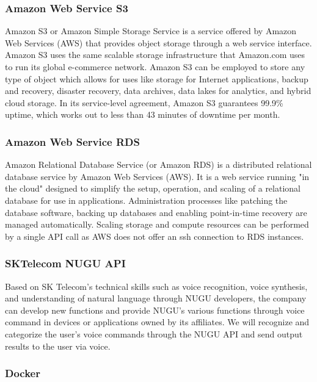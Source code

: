 \documentclass[conference,compsoc]{IEEEtran}
\begin{document}
\subsubsection{Amazon Web Service S3}

Amazon S3 or Amazon Simple Storage Service is a service offered by Amazon Web Services (AWS) that provides object storage through a web service interface. Amazon S3 uses the same scalable storage infrastructure that Amazon.com uses to run its global e-commerce network. Amazon S3 can be employed to store any type of object which allows for uses like storage for Internet applications, backup and recovery, disaster recovery, data archives, data lakes for analytics, and hybrid cloud storage. In its service-level agreement, Amazon S3 guarantees 99.9\% uptime, which works out to less than 43 minutes of downtime per month.

\subsubsection{Amazon Web Service RDS}

Amazon Relational Database Service (or Amazon RDS) is a distributed relational database service by Amazon Web Services (AWS). It is a web service running "in the cloud" designed to simplify the setup, operation, and scaling of a relational database for use in applications. Administration processes like patching the database software, backing up databases and enabling point-in-time recovery are managed automatically. Scaling storage and compute resources can be performed by a single API call as AWS does not offer an ssh connection to RDS instances.

\subsubsection{SKTelecom NUGU API}

Based on SK Telecom's technical skills such as voice recognition, voice synthesis, and understanding of natural language through NUGU developers, the company can develop new functions and provide NUGU's various functions through voice command in devices or applications owned by its affiliates. We will recognize and categorize the user's voice commands through the NUGU API and send output results to the user via voice.

\subsubsection{Docker}
\end{document}
